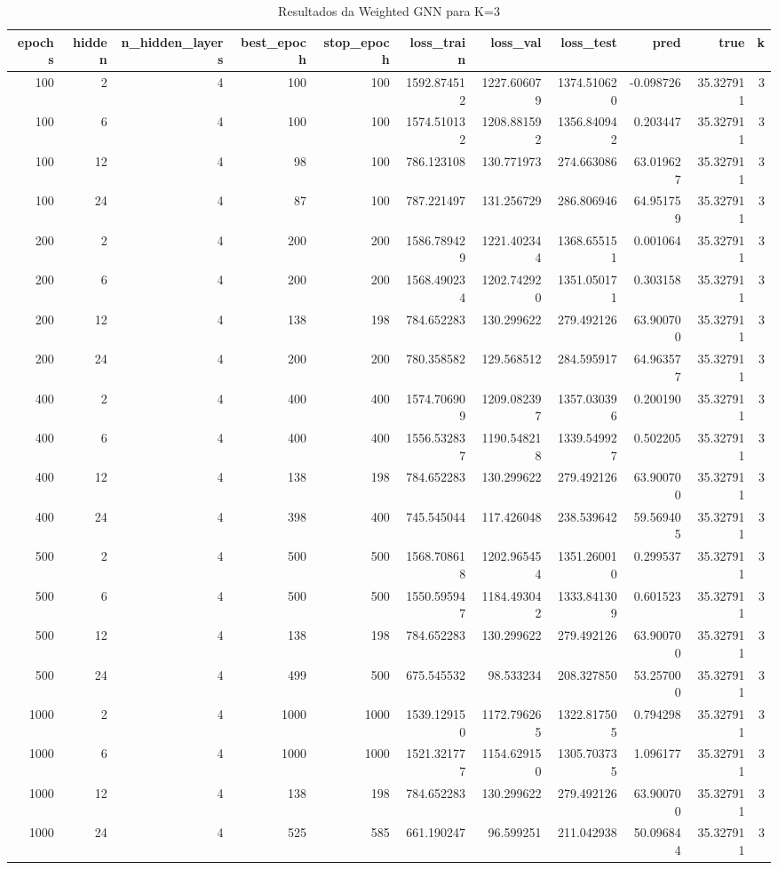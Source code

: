 \begin{table}
\caption{Resultados da Weighted GNN para K=3}
\label{tab:weighted_gnn_results_k3}
\begin{tabular}{rrrrrrrrrrr}
\toprule
epochs & hidden & n\_hidden\_layers & best\_epoch & stop\_epoch & loss\_train & loss\_val & loss\_test & pred & true & k \\
\midrule
100 & 2 & 4 & 100 & 100 & 1592.874512 & 1227.606079 & 1374.510620 & -0.098726 & 35.327911 & 3 \\
100 & 6 & 4 & 100 & 100 & 1574.510132 & 1208.881592 & 1356.840942 & 0.203447 & 35.327911 & 3 \\
100 & 12 & 4 & 98 & 100 & 786.123108 & 130.771973 & 274.663086 & 63.019627 & 35.327911 & 3 \\
100 & 24 & 4 & 87 & 100 & 787.221497 & 131.256729 & 286.806946 & 64.951759 & 35.327911 & 3 \\
200 & 2 & 4 & 200 & 200 & 1586.789429 & 1221.402344 & 1368.655151 & 0.001064 & 35.327911 & 3 \\
200 & 6 & 4 & 200 & 200 & 1568.490234 & 1202.742920 & 1351.050171 & 0.303158 & 35.327911 & 3 \\
200 & 12 & 4 & 138 & 198 & 784.652283 & 130.299622 & 279.492126 & 63.900700 & 35.327911 & 3 \\
200 & 24 & 4 & 200 & 200 & 780.358582 & 129.568512 & 284.595917 & 64.963577 & 35.327911 & 3 \\
400 & 2 & 4 & 400 & 400 & 1574.706909 & 1209.082397 & 1357.030396 & 0.200190 & 35.327911 & 3 \\
400 & 6 & 4 & 400 & 400 & 1556.532837 & 1190.548218 & 1339.549927 & 0.502205 & 35.327911 & 3 \\
400 & 12 & 4 & 138 & 198 & 784.652283 & 130.299622 & 279.492126 & 63.900700 & 35.327911 & 3 \\
400 & 24 & 4 & 398 & 400 & 745.545044 & 117.426048 & 238.539642 & 59.569405 & 35.327911 & 3 \\
500 & 2 & 4 & 500 & 500 & 1568.708618 & 1202.965454 & 1351.260010 & 0.299537 & 35.327911 & 3 \\
500 & 6 & 4 & 500 & 500 & 1550.595947 & 1184.493042 & 1333.841309 & 0.601523 & 35.327911 & 3 \\
500 & 12 & 4 & 138 & 198 & 784.652283 & 130.299622 & 279.492126 & 63.900700 & 35.327911 & 3 \\
500 & 24 & 4 & 499 & 500 & 675.545532 & 98.533234 & 208.327850 & 53.257000 & 35.327911 & 3 \\
1000 & 2 & 4 & 1000 & 1000 & 1539.129150 & 1172.796265 & 1322.817505 & 0.794298 & 35.327911 & 3 \\
1000 & 6 & 4 & 1000 & 1000 & 1521.321777 & 1154.629150 & 1305.703735 & 1.096177 & 35.327911 & 3 \\
1000 & 12 & 4 & 138 & 198 & 784.652283 & 130.299622 & 279.492126 & 63.900700 & 35.327911 & 3 \\
1000 & 24 & 4 & 525 & 585 & 661.190247 & 96.599251 & 211.042938 & 50.096844 & 35.327911 & 3 \\
\bottomrule
\end{tabular}
\end{table}
